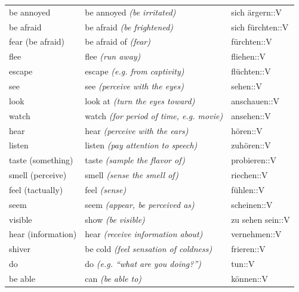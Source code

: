 \begin{center}
\begin{longtable}{lll}
{\sc \lowercase{	BE ANNOYED	}}	&	be annoyed	\textit{\footnotesize (be irritated)}	&	sich ärgern::V	\\
{\sc \lowercase{	BE AFRAID	}}	&	be afraid	\textit{\footnotesize (be frightened)}	&	sich fürchten::V	\\
{\sc \lowercase{	FEAR \footnotesize (BE AFRAID)	}}	&	be afraid of	\textit{\footnotesize (fear)}	&	fürchten::V	\\
{\sc \lowercase{	FLEE	}}	&	flee	\textit{\footnotesize (run away)}	&	fliehen::V	\\
{\sc \lowercase{	ESCAPE	}}	&	escape	\textit{\footnotesize (e.g. from captivity)}	&	flüchten::V	\\
{\sc \lowercase{	SEE	}}	&	see	\textit{\footnotesize (perceive with the eyes)}	&	sehen::V	\\
{\sc \lowercase{	LOOK	}}	&	look at	\textit{\footnotesize (turn the eyes toward)}	&	anschauen::V	\\
{\sc \lowercase{	WATCH	}}	&	watch	\textit{\footnotesize (for period of time, e.g. movie)}	&	ansehen::V	\\
{\sc \lowercase{	HEAR	}}	&	hear	\textit{\footnotesize (perceive with the ears)}	&	hören::V	\\
{\sc \lowercase{	LISTEN	}}	&	listen	\textit{\footnotesize (pay attention to speech)}	&	zuhören::V	\\
{\sc \lowercase{	TASTE \footnotesize (SOMETHING)	}}	&	taste	\textit{\footnotesize (sample the flavor of)}	&	probieren::V	\\
{\sc \lowercase{	SMELL \footnotesize (PERCEIVE)	}}	&	smell	\textit{\footnotesize (sense the smell of)}	&	riechen::V	\\
{\sc \lowercase{	FEEL \footnotesize (TACTUALLY)	}}	&	feel	\textit{\footnotesize (sense)}	&	fühlen::V	\\
{\sc \lowercase{	SEEM	}}	&	seem	\textit{\footnotesize (appear, be perceived as)}	&	scheinen::V	\\
{\sc \lowercase{	VISIBLE	}}	&	show	\textit{\footnotesize (be visible)}	&	zu sehen sein::V	\\
{\sc \lowercase{	HEAR \footnotesize (INFORMATION)	}}	&	hear	\textit{\footnotesize (receive information about)}	&	vernehmen::V	\\
{\sc \lowercase{	SHIVER	}}	&	be cold	\textit{\footnotesize (feel sensation of coldness)}	&	frieren::V	\\
{\sc \lowercase{	DO	}}	&	do	\textit{\footnotesize (e.g. ``what are you doing?'')}	&	tun::V	\\
{\sc \lowercase{	BE ABLE	}}	&	can	\textit{\footnotesize (be able to)}	&	können::V	\\

\end{longtable}
\end{center}

